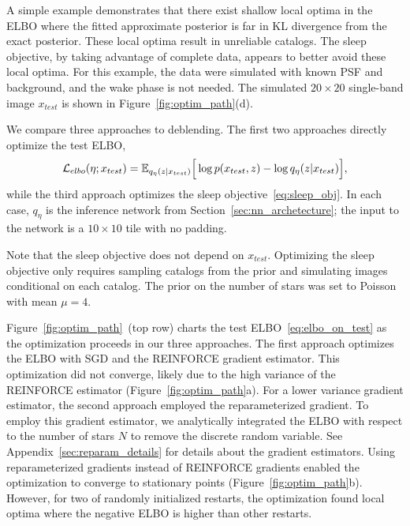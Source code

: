 

\label{sec:elbo_sleep_compare}

A simple example demonstrates that there exist shallow local optima in the ELBO
where the fitted approximate posterior is far in KL divergence from the exact posterior. 
These local optima result in unreliable catalogs. 
The sleep objective, by taking advantage of  complete data, appears to better avoid these local optima. 
For this example, the data were simulated with known PSF and background, and the wake phase is not needed. 
The simulated $20\times20$ single-band image $x_{test}$ is shown in Figure~\ref{fig:optim_path}(d).


We compare three approaches to deblending. The first two approaches directly optimize the test ELBO, 
\begin{align}
\mathcal{L}_{elbo}(\eta; x_{test}) = \mathbb{E}_{q_{\eta}(z | x_{test})}\Big[\log p(x_{test}, z) - \log q_{\eta}(z | x_{test})\Big],
\label{eq:elbo_on_test}
\end{align}
while the third approach optimizes the sleep objective~\eqref{eq:sleep_obj}. 
In each case, $q_\eta$ is the inference network from Section~\ref{sec:nn_archetecture}; the input to the network is a $10\times 10$ tile with no padding. 

Note that the sleep objective does not depend on $x_{test}$. 
Optimizing the sleep objective only requires sampling catalogs from the prior
and simulating images conditional on each catalog. 
The prior on the number of stars was set to Poisson with mean $\mu = 4$. 

Figure~\ref{fig:optim_path}~(top row) charts the test ELBO~\eqref{eq:elbo_on_test} as the optimization proceeds in our three approaches.
The first approach optimizes the ELBO with SGD and the REINFORCE gradient estimator.
This optimization did not converge, likely due to the high variance of the REINFORCE estimator (Figure~\ref{fig:optim_path}a). 
For a lower variance gradient estimator, the second approach employed the reparameterized gradient. To employ this gradient estimator, we analytically integrated the ELBO with respect to the number of stars $N$ to remove the discrete random variable. 
See Appendix~\ref{sec:reparam_details} for details about the gradient estimators. 
Using reparameterized gradients instead of REINFORCE gradients enabled the optimization to converge to stationary points (Figure~\ref{fig:optim_path}b). 
However, for two of randomly initialized restarts, 
the optimization found local optima where the negative ELBO is higher than other restarts. 

